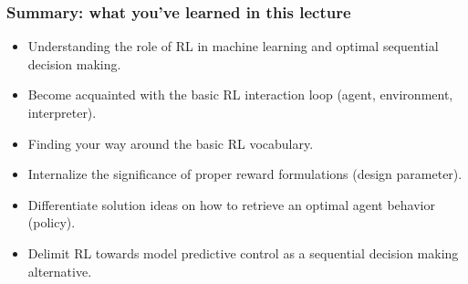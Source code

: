 \begin{frame}
\frametitle{Summary: what you've learned in this lecture}
\begin{itemize}
	\item Understanding the role of RL in machine learning and optimal sequential decision making. \pause
	\item Become acquainted with the basic RL interaction loop (agent, environment, interpreter). \pause
	\item Finding your way around the basic RL vocabulary. \pause
	\item Internalize the significance of proper reward formulations (design parameter). \pause
	\item Differentiate solution ideas on how to retrieve an optimal agent behavior (policy). \pause
	\item Delimit RL towards model predictive control as a sequential decision making alternative. 
\end{itemize}
\end{frame}
